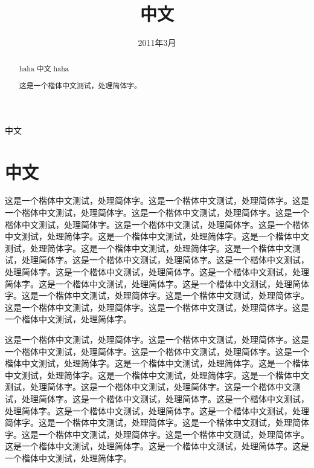 \documentclass[]{article}
\date{2011年3月}
\title{中文}
\author{}
\begin{document}
\begin{CJK}{UTF8}{gkai}
\maketitle

\begin{abstract}
haha 中文 haha

	这是一个楷体中文测试，处理简体字。

\end{abstract}
中文
\section{中文}

	这是一个楷体中文测试，处理简体字。这是一个楷体中文测试，处理简体字。这是一个楷体中文测试，处理简体字。这是一个楷体中文测试，处理简体字。这是一个楷体中文测试，处理简体字。这是一个楷体中文测试，处理简体字。这是一个楷体中文测试，处理简体字。这是一个楷体中文测试，处理简体字。这是一个楷体中文测试，处理简体字。这是一个楷体中文测试，处理简体字。这是一个楷体中文测试，处理简体字。这是一个楷体中文测试，处理简体字。这是一个楷体中文测试，处理简体字。这是一个楷体中文测试，处理简体字。这是一个楷体中文测试，处理简体字。这是一个楷体中文测试，处理简体字。这是一个楷体中文测试，处理简体字。这是一个楷体中文测试，处理简体字。这是一个楷体中文测试，处理简体字。这是一个楷体中文测试，处理简体字。这是一个楷体中文测试，处理简体字。这是一个楷体中文测试，处理简体字。

	这是一个楷体中文测试，处理简体字。这是一个楷体中文测试，处理简体字。这是一个楷体中文测试，处理简体字。这是一个楷体中文测试，处理简体字。这是一个楷体中文测试，处理简体字。这是一个楷体中文测试，处理简体字。这是一个楷体中文测试，处理简体字。这是一个楷体中文测试，处理简体字。这是一个楷体中文测试，处理简体字。这是一个楷体中文测试，处理简体字。这是一个楷体中文测试，处理简体字。这是一个楷体中文测试，处理简体字。这是一个楷体中文测试，处理简体字。这是一个楷体中文测试，处理简体字。这是一个楷体中文测试，处理简体字。这是一个楷体中文测试，处理简体字。这是一个楷体中文测试，处理简体字。这是一个楷体中文测试，处理简体字。这是一个楷体中文测试，处理简体字。这是一个楷体中文测试，处理简体字。这是一个楷体中文测试，处理简体字。这是一个楷体中文测试，处理简体字。

\end{CJK}
\end{document}

